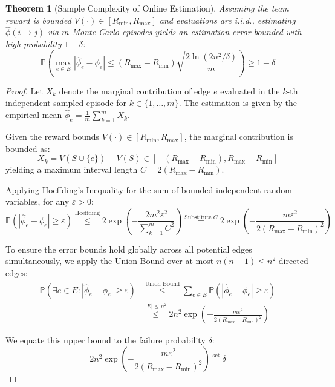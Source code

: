 \documentclass{article}
\newtheorem{theorem}{Theorem}
\begin{document}
\begin{theorem}[Sample Complexity of Online Estimation]
Assuming the team reward is bounded $V(\cdot) \in [R_{\min}, R_{\max}]$ and evaluations are i.i.d., estimating $\hat{\phi}(i \to j)$ via $m$ Monte Carlo episodes yields an estimation error bounded with high probability $1-\delta$:
\begin{equation}
    \mathbb{P}\left(\max_{e \in E}|\hat{\phi}_e - \phi_e| \le (R_{\max} - R_{\min}) \sqrt{\frac{2\ln(2n^2/\delta)}{m}}\right) \ge 1 - \delta
\end{equation}
\end{theorem}
\begin{proof}
Let $X_k$ denote the marginal contribution of edge $e$ evaluated in the $k$-th independent sampled episode for $k \in \{1, \dots, m\}$. The estimation is given by the empirical mean $\hat{\phi}_e = \frac{1}{m}\sum_{k=1}^m X_k$.

Given the reward bounds $V(\cdot) \in [R_{\min}, R_{\max}]$, the marginal contribution is bounded as:
\begin{equation}
    X_k = V(S \cup \{e\}) - V(S) \in [-(R_{\max} - R_{\min}), R_{\max} - R_{\min}]
\end{equation}
yielding a maximum interval length $C = 2(R_{\max} - R_{\min})$.

Applying Hoeffding's Inequality for the sum of bounded independent random variables, for any $\varepsilon > 0$:
\begin{equation}
    \mathbb{P}\left(|\hat{\phi}_e - \phi_e| \ge \varepsilon\right) \overset{\text{Hoeffding}}{\le} 2 \exp\left(-\frac{2m^2\varepsilon^2}{\sum_{k=1}^m C^2}\right) \overset{\text{Substitute } C}{=} 2 \exp\left(-\frac{m\varepsilon^2}{2(R_{\max} - R_{\min})^2}\right)
\end{equation}

To ensure the error bounds hold globally across all potential edges simultaneously, we apply the Union Bound over at most $n(n-1) \le n^2$ directed edges:
\begin{align}
    \mathbb{P}\left(\exists e \in E : |\hat{\phi}_e - \phi_e| \ge \varepsilon\right) 
    &\overset{\text{Union Bound}}{\le} \sum_{e \in E} \mathbb{P}\left(|\hat{\phi}_e - \phi_e| \ge \varepsilon\right) \\
    &\overset{|E| \le n^2}{\le} 2n^2 \exp\left(-\frac{m\varepsilon^2}{2(R_{\max} - R_{\min})^2}\right)
\end{align}

We equate this upper bound to the failure probability $\delta$:
\begin{equation}
    2n^2 \exp\left(-\frac{m\varepsilon^2}{2(R_{\max} - R_{\min})^2}\right) \overset{\text{set}}{=} \delta
\end{equation}


\end{proof}
\end{document}
